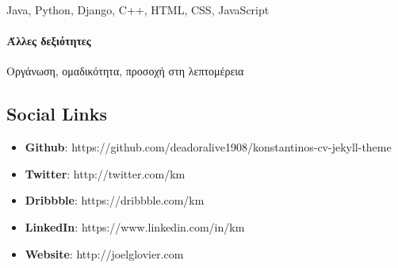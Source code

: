 \documentclass[
]{article}
\providecommand{\tightlist}{%
  \setlength{\itemsep}{0pt}\setlength{\parskip}{0pt}}
\begin{document}
Java, Python, Django, C++, HTML, CSS, JavaScript

\hypertarget{ux3acux3bbux3bbux3b5ux3c2-ux3b4ux3b5ux3beux3b9ux3ccux3c4ux3b7ux3c4ux3b5ux3c2}{%
\paragraph{Άλλες
δεξιότητες}\label{ux3acux3bbux3bbux3b5ux3c2-ux3b4ux3b5ux3beux3b9ux3ccux3c4ux3b7ux3c4ux3b5ux3c2}}

Οργάνωση, ομαδικότητα, προσοχή στη λεπτομέρεια

\hypertarget{social-links}{%
\subsection{Social Links}\label{social-links}}

\begin{itemize}
\tightlist
\item
  \textbf{Github}:
  https://github.com/deadoralive1908/konstantinos-cv-jekyll-theme
\item
  \textbf{Twitter}: http://twitter.com/km
\item
  \textbf{Dribbble}: https://dribbble.com/km
\item
  \textbf{LinkedIn}: https://www.linkedin.com/in/km
\item
  \textbf{Website}: http://joelglovier.com
\end{itemize}
\end{document}
